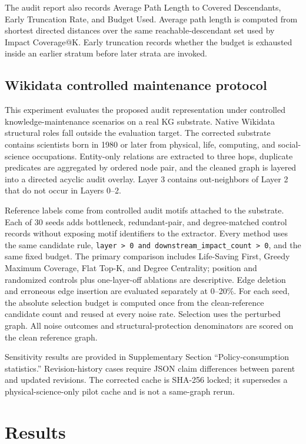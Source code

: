 \documentclass[pdflatex,sn-basic]{sn-jnl}
\begin{document}
The audit report also records Average Path Length to Covered Descendants, Early Truncation Rate, and Budget Used. Average path length is computed from shortest directed distances over the same reachable-descendant set used by Impact Coverage@K. Early truncation records whether the budget is exhausted inside an earlier stratum before later strata are invoked.

\subsection{Wikidata controlled maintenance protocol}

This experiment evaluates the proposed audit representation under controlled knowledge-maintenance scenarios on a real KG substrate. Native Wikidata structural roles fall outside the evaluation target. The corrected substrate contains scientists born in 1980 or later from physical, life, computing, and social-science occupations. Entity-only relations are extracted to three hops, duplicate predicates are aggregated by ordered node pair, and the cleaned graph is layered into a directed acyclic audit overlay. Layer 3 contains out-neighbors of Layer 2 that do not occur in Layers 0--2.

Reference labels come from controlled audit motifs attached to the substrate. Each of 30 seeds adds bottleneck, redundant-pair, and degree-matched control records without exposing motif identifiers to the extractor. Every method uses the same candidate rule, \texttt{layer > 0 and downstream\_impact\_count > 0}, and the same fixed budget. The primary comparison includes Life-Saving First, Greedy Maximum Coverage, Flat Top-K, and Degree Centrality; position and randomized controls plus one-layer-off ablations are descriptive. Edge deletion and erroneous edge insertion are evaluated separately at 0--20\%. For each seed, the absolute selection budget is computed once from the clean-reference candidate count and reused at every noise rate. Selection uses the perturbed graph. All noise outcomes and structural-protection denominators are scored on the clean reference graph.

Sensitivity results are provided in Supplementary Section ``Policy-consumption statistics.'' Revision-history cases require JSON claim differences between parent and updated revisions. The corrected cache is SHA-256 locked; it supersedes a physical-science-only pilot cache and is not a same-graph rerun.



\section{Results}
\label{sec:experimental-results}
\end{document}
